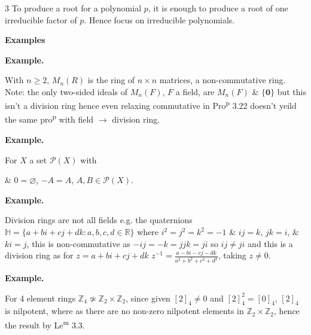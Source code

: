 \documentclass[8pt]{extarticle}
\newcommand{\fitdisplay}[1]{%
  \par\vspace{-1pt}\noindent
  \sbox{\fitdisplaybox}{#1}%
  \makebox[\columnwidth][c]{%
    \ifdim\wd\fitdisplaybox>\columnwidth
      \resizebox{\columnwidth}{!}{#1}%
    \else
      \usebox{\fitdisplaybox}%
    \fi
  }%
  \par\vspace{-1pt}%
}
\newenvironment{example}{%
  \begin{tcolorbox}[exampleboxstyle]%
  \textbf{Example.}\ \normalfont
  \ignorespaces
}{%
  \end{tcolorbox}%
}
\begin{document}
\begin{multicols*}{3}
        {\footnotesize To produce a root for a polynomial \(p\), it is enough to produce a root of one irreducible factor of \(p\). Hence focus on irreducible polynomials.}





        \vspace{2pt}
        {\centering\fontsize{6}{6.8}\selectfont\textbf{Examples}\par}
        \vspace{2pt}

        \begin{example}
            With \(n\ge 2\), \(M_n(R)\) is the ring of \(n\times n\) matrices, a non-commutative ring.
            {\footnotesize Note: the only two-sided ideals of \(M_n(F)\), \(F\) a field, are \(M_n(F)\) \& \(\{\mathbf{0}\}\) but this isn't a division ring hence even relaxing commutative in Pro\textsuperscript{p} 3.22 doesn't yeild the same pro\textsuperscript{p} with field \(\to\) division ring.}
        \end{example}

        \begin{example}
            For \(X\) a set \(\mathcal{P}(X)\) with
            
            \fitdisplay{\(\begin{aligned}A+B&=(A\cup B)\setminus(A\cap B),\\ AB&=A\cap B\end{aligned}\)}

            \& \(0=\varnothing\), \(-A=A\), \(A,B\in\mathcal{P}(X)\).
        \end{example}

        \begin{example}
            Division rings are not all fields e.g. the quaternions \(\mathbb{H}=\{a+bi+cj+dk:a,b,c,d\in\mathbb{R}\}\) where \(i^2=j^2=k^2=-1\) \& \(ij=k\), \(jk=i\), \& \(ki=j\), this is non-commutative as \(-ij=-k=jjk=ji\) so \(ij\ne ji\) and this is a division ring as for \(z=a+bi+cj+dk\) \(z^{-1}=\frac{a-bi-cj-dk}{a^2+b^2+c^2+d^2}\), taking \(z\ne0\).
        \end{example}

        \begin{example}
            For 4 element rings \(\mathbb{Z}_4 \not\simeq \mathbb{Z}_2\times\mathbb{Z}_2\), since given \([2]_4\ne0\) and \([2]_4^2=[0]_4\), \([2]_4\) is nilpotent, where as there are no non-zero nilpotent elements in \(\mathbb{Z}_2\times\mathbb{Z}_2\), hence the result by Le\textsuperscript{m} 3.3.
        \end{example}


\end{multicols*}
\end{document}

